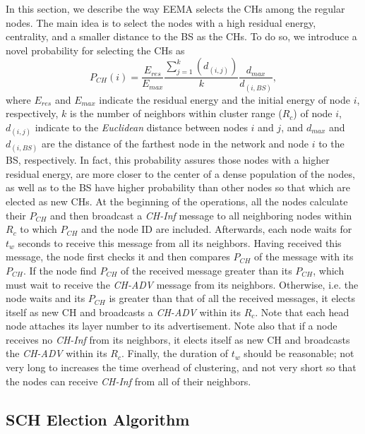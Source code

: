 \documentclass[journal]{IEEEtran}
\begin{document}
 In this section, we describe the way EEMA selects the CHs among the regular nodes.  The main idea is to select the nodes with a high residual energy, centrality, and a smaller distance to the BS as the CHs.  To do so, we introduce a novel probability for selecting the CHs as 
\begin{equation}
\label{eq-PCH}
P_{CH}(i)=\frac{E_{res}}{E_{max}}\frac{\sum_{j=1}^{k}(d_{(i,j)})}{k}\frac{d_{max}}{d_{(i,BS)}},
\end{equation}
where $E_{res}$ and $E_{max}$ indicate the residual energy and the initial energy of node $i$, respectively, $k$ is the number of neighbors within cluster range ($R_{c}$) of node $i$, $d_{(i,j)}$ indicate to the \textit{Euclidean} distance between nodes $i$ and $j$, and $d_{max}$ and $d_{(i,BS)}$ are the distance of the farthest node in the network and node $i$ to the BS, respectively. In fact, this probability assures those nodes with a higher residual energy, are more closer to the center of a dense population of the nodes, as well as to the BS have higher probability than other nodes so that which are elected as new CHs. 
At the beginning of the operations, all the nodes calculate their $P_{CH}$  and then broadcast a {\it CH-Inf} message to all neighboring nodes within $R_{c}$ to which $P_{CH}$ and the node ID are included.  Afterwards, each node waits for $t_{w}$ seconds to receive this message from all its neighbors.  Having received this message, the node first checks it and then compares $P_{CH}$ of the message with its $P_{CH}$. If the node find $P_{CH}$ of the received message greater than its $P_{CH}$, which must wait to receive the {\it CH-ADV} message from its neighbors.  Otherwise, i.e. the node waits and its $P_{CH}$ is greater than that of all the received messages, it elects itself as new CH  and  broadcasts a {\it CH-ADV} within its $R_{c}$. Note that each head node attaches its layer number to its advertisement. Note also that if a node receives no {\it CH-Inf} from its neighbors, it elects itself as new CH and broadcasts the {\it CH-ADV} within its $R_{c}$. Finally, the duration of $t_{w}$ should be reasonable; not very long to increases the time overhead of clustering, and not very short so that the nodes can receive {\it CH-Inf} from all of their neighbors.
 
 \subsection{SCH Election Algorithm}
\label{subsec:SCH-el}
\end{document}

